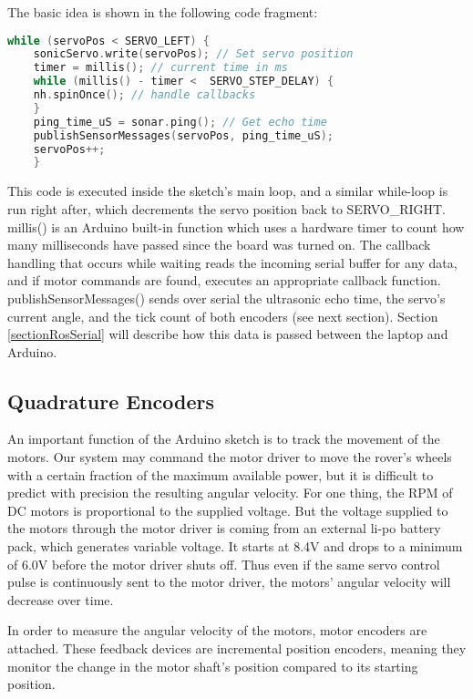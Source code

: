 The basic idea is shown in the following code fragment:
\begin{mdframed}[backgroundcolor=light-gray, roundcorner=10pt,leftmargin=1, rightmargin=1, innerleftmargin=15, innertopmargin=15,innerbottommargin=15, outerlinewidth=1, linecolor=light-gray]
	\begin{lstlisting}[language=C++]
	while (servoPos < SERVO_LEFT) {
	sonicServo.write(servoPos); // Set servo position
	timer = millis(); // current time in ms
	while (millis() - timer <  SERVO_STEP_DELAY) {
	nh.spinOnce(); // handle callbacks
	}
	ping_time_uS = sonar.ping(); // Get echo time
	publishSensorMessages(servoPos, ping_time_uS);
	servoPos++;
	}
	\end{lstlisting}
\end{mdframed}

This code is executed inside the sketch's main loop, and a similar while-loop is run right after, which decrements the servo position back to SERVO\_RIGHT. millis() is an Arduino built-in function which uses a hardware timer to count how many milliseconds have passed since the board was turned on. The callback handling that occurs while waiting reads the incoming serial buffer for any data, and if motor commands are found, executes an appropriate callback function. publishSensorMessages() sends over serial the ultrasonic echo time, the servo's current angle, and the tick count of both encoders (see next section). Section \ref{sectionRosSerial} will describe how this data is passed between the laptop and Arduino.

\subsection{Quadrature Encoders} \label{sectionQuadEncoders}
An important function of the Arduino sketch is to track the movement of the motors. Our system may command the motor driver to move the rover's wheels with a certain fraction of the maximum available power, but it is difficult to predict with precision the resulting angular velocity. For one thing, the RPM of DC motors is proportional to the supplied voltage. But the voltage supplied to the motors through the motor driver is coming from an external li-po battery pack, which generates variable voltage. It starts at 8.4V and drops to a minimum of 6.0V before the motor driver shuts off. Thus even if the same servo control pulse is continuously sent to the motor driver, the motors' angular velocity will decrease over time.

In order to measure the angular velocity of the motors, motor encoders are attached. These feedback devices are incremental position encoders, meaning they monitor the change in the motor shaft's position compared to its starting position. 

